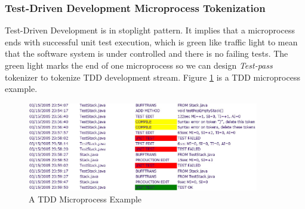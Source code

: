 \subsubsection{Test-Driven Development Microprocess Tokenization}
Test-Driven Development is in stoplight pattern. It implies that a
microprocess ends with successful unit test execution, which is green like
traffic light to mean that the software system is under controlled and
there is no failing tests. The green light marks the end of one microprocess
so we can design \textit{Test-pass} tokenizer to tokenize TDD development
stream. Figure \ref{fig:TddMicro} is a TDD microprocess example.
\begin{figure}[h]
  \centering
  \includegraphics[width=0.9\textwidth]{figs/TestPassEpisode.eps}
  \caption{A TDD Microprocess Example}\label{fig:TddMicro}
\end{figure} 

